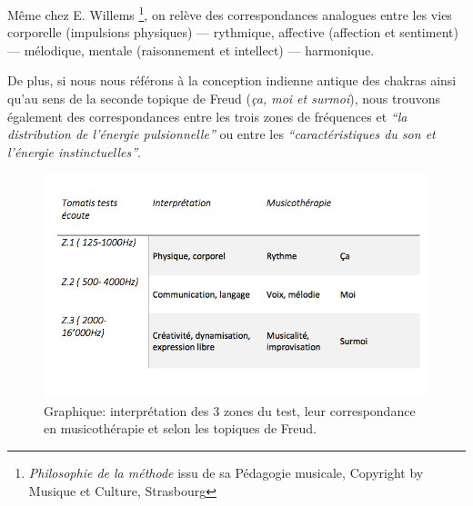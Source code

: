 Même chez E. Willems \autocite{willems} \footnote{\textit{Philosophie de la méthode} issu de sa
Pédagogie musicale, Copyright by Musique et Culture, Strasbourg}, on relève des correspondances analogues entre les vies
corporelle (impulsions physiques)
--- rythmique, affective (affection et sentiment) --- mélodique, mentale
(raisonnement et intellect) --- harmonique.


De plus, si nous nous référons à la conception indienne antique des chakras
ainsi qu'au sens de la seconde
topique de Freud (\textit{ça, moi et surmoi}), nous trouvons également des correspondances
entre les trois zones de
fréquences et \textit{``la distribution de l'énergie pulsionnelle''} ou entre
les
\textit{``caractéristiques du son et l'énergie
instinctuelles''}\autocite[ch. 13]{auriol_cle_1996}.

\begin{figure}
	\centering
	\includegraphics[width=0.7\linewidth]{images/testinterpmusico}
	\caption[ L'interprétation des 3 zones et leur correspondance
        en musicothérapie]{Graphique: interprétation des 3 zones du
          test, leur correspondance en musicothérapie et selon les
          topiques de Freud.}

	\label{graphiquecolonnetestmusico}
      \end{figure}






